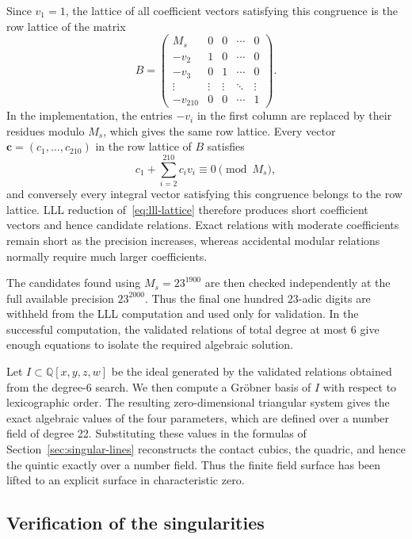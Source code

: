 \documentclass[10pt,a4paper]{article}
\begin{document}
Since $v_1=1$, the lattice of all coefficient vectors satisfying this
congruence is the row lattice of the matrix
\begin{equation}
\label{eq:lll-lattice}
 B=
 \begin{pmatrix}
 M_s      &0&0&\cdots&0\\
 -v_2     &1&0&\cdots&0\\
 -v_3     &0&1&\cdots&0\\
 \vdots   &\vdots&\vdots&\ddots&\vdots\\
 -v_{210} &0&0&\cdots&1
 \end{pmatrix}.
\end{equation}
In the implementation, the entries $-v_i$ in the first column are replaced
by their residues modulo $M_s$, which gives the same row lattice.
Every vector $\boldsymbol c=(c_1,\ldots,c_{210})$ in the row lattice of $B$
satisfies
\[
        c_1+\sum_{i=2}^{210}c_iv_i\equiv0\pmod {M_s},
\]
and conversely every integral vector satisfying this congruence belongs to
the row lattice.  LLL reduction of~\eqref{eq:lll-lattice} therefore produces
short coefficient vectors and hence candidate relations.  Exact relations
with moderate coefficients remain short as the precision increases, whereas
accidental modular relations normally require much larger coefficients.

The candidates found using $M_s=23^{1900}$ are then checked independently at
the full available precision $23^{2000}$.  Thus the final one hundred
$23$-adic digits are withheld from the LLL computation and used only for
validation.  In the successful computation, the validated relations of total
degree at most $6$ give enough equations to isolate the required algebraic
solution.

Let $I\subset\mathbb Q[x,y,z,w]$
be the ideal generated by the validated relations obtained from the degree-$6$
search.  We then compute a Gr\"obner basis of $I$ with respect to lexicographic order.  The
resulting zero-dimensional triangular system gives the exact algebraic values
of the four parameters, which are defined over a number field of degree 22.
Substituting these values in the formulas of
Section~\ref{sec:singular-lines} reconstructs the contact cubics, the quadric,
and hence the quintic exactly over a number field.  Thus the finite field
surface has been lifted to an explicit surface in characteristic zero.


\subsection{Verification of the singularities}
\label{sec:verification}
\end{document}

